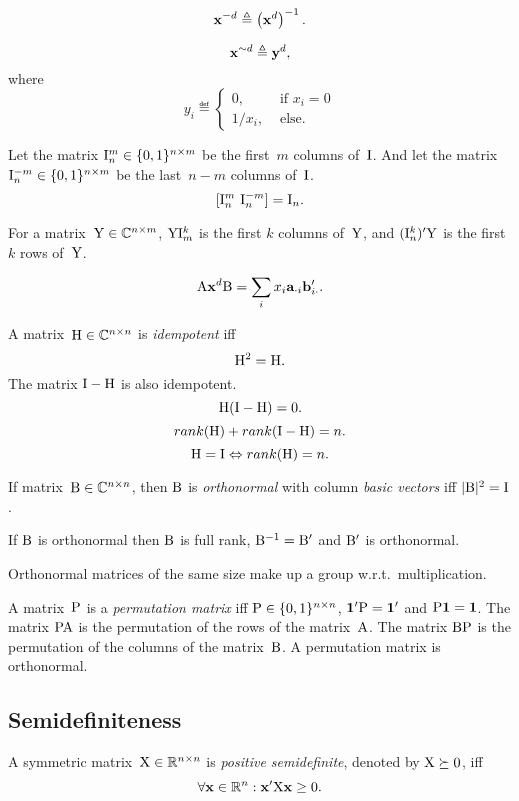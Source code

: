 \documentclass[10pt,a4paper]{article}
\theoremstyle{plain} \newtheorem{Lem}{Lemma}
\begin{document}
$$ \mathbf x^{-d} \triangleq \left(\mathbf x^d \right)^{-1}. $$

$$ \mathbf x^{\sim d} \triangleq \mathbf y^d, $$
where 
\begin{equation*}
  y_i \eqdef 
  \begin{cases}
     0, &\text{ if } x_i = 0\\
     1/x_i,   &\text{ else.}
  \end{cases}
\end{equation*}

Let the matrix $\mathrm I_n^m \in \{0,1\}^{n \times m}$ be the first~$m$ columns of~$\mathrm I$.
And let the matrix $\mathrm I_n^{-m} \in \{0,1\}^{n \times m}$ be the last~$n-m$ columns of~$\mathrm I$.
$$ [\mathrm I_n^m \ \mathrm I_n^{-m}] = \mathrm I_n. $$

For a matrix~$\mathrm Y \in \mathbb C^{n \times m}$, 
$\mathrm Y \mathrm I^k_m$ is the first $k$ columns of~$\mathrm Y$, 
and
$(\mathrm I^k_n)' \mathrm Y$ is the first $k$ rows of~$\mathrm Y$.

$$\mathrm A \mathbf x^d \mathrm B = \sum_i x_i \mathbf a_{\cdot i} \mathbf b_{i \cdot}'. $$

A matrix~$\mathrm H \in \mathbb C^{n \times n}$ is {\em idempotent} iff
$$ \mathrm H^2 = \mathrm H. $$
The matrix $\mathrm I - \mathrm H$ is also idempotent.
$$ \mathrm H (\mathrm I - \mathrm H) = \mathrm 0. $$
$$ rank(\mathrm H) + rank(\mathrm I - \mathrm H) = n. $$
$$ \mathrm H = \mathrm I \Leftrightarrow rank(\mathrm H) = n. $$

{If matrix~$\mathrm B \in \mathbb C^{n \times n}$, then $\mathrm B$ is {\em orthonormal} with column {\em basic vectors} iff $|\mathrm B|^2 = \mathrm I$.
}

If $\mathrm B$ is orthonormal then $\mathrm B$ is full rank, $\mathrm B^{-1} = \mathrm B'$ and $\mathrm B'$ is orthonormal.

Orthonormal matrices of the same size make up a group w.r.t.~multiplication.

A matrix~$\mathrm P$ is a {\em permutation matrix} 
iff $\mathrm P \in \{0,1\}^{n \times n}$, $\mathbf 1' \mathrm P = \mathbf 1'$ and $\mathrm P \mathbf 1 = \mathbf 1$.
The matrix $\mathrm P \mathrm A$ is the permutation of the rows of the matrix~$\mathrm A$.
The matrix $\mathrm B \mathrm P$ is the permutation of the columns of the matrix~$\mathrm B$.
A permutation matrix is orthonormal.



\subsection{Semidefiniteness}

A symmetric matrix~$\mathrm X \in \mathbb R^{n \times n}$ is {\em positive semidefinite}, denoted by $\mathrm X \succeq 0$, iff 
$$\forall \mathbf x \in \mathbb R^n: \mathbf x' \mathrm X \mathbf x \ge 0. $$
\end{document}
